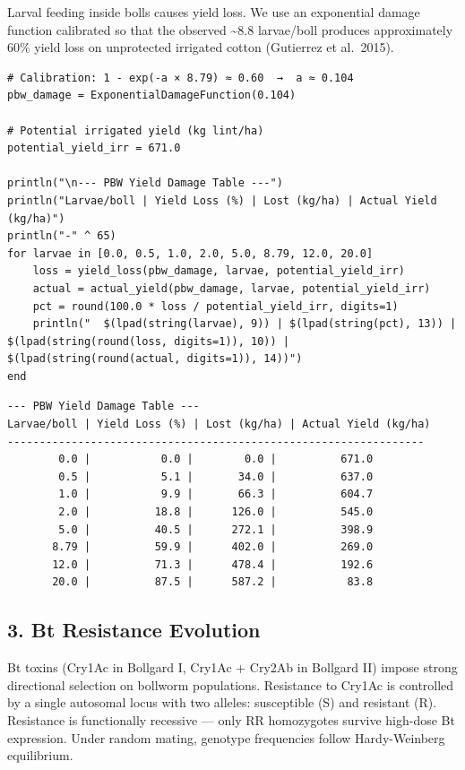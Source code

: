 \label{11186946840608408388}{}


Larval feeding inside bolls causes yield loss. We use an exponential damage function calibrated so that the observed {\textasciitilde}8.8 larvae/boll produces approximately 60\% yield loss on unprotected irrigated cotton (Gutierrez et al.~2015).




\begin{verbatim}
# Calibration: 1 - exp(-a × 8.79) ≈ 0.60  →  a ≈ 0.104
pbw_damage = ExponentialDamageFunction(0.104)

# Potential irrigated yield (kg lint/ha)
potential_yield_irr = 671.0

println("\n--- PBW Yield Damage Table ---")
println("Larvae/boll | Yield Loss (%) | Lost (kg/ha) | Actual Yield (kg/ha)")
println("-" ^ 65)
for larvae in [0.0, 0.5, 1.0, 2.0, 5.0, 8.79, 12.0, 20.0]
    loss = yield_loss(pbw_damage, larvae, potential_yield_irr)
    actual = actual_yield(pbw_damage, larvae, potential_yield_irr)
    pct = round(100.0 * loss / potential_yield_irr, digits=1)
    println("  $(lpad(string(larvae), 9)) | $(lpad(string(pct), 13)) | $(lpad(string(round(loss, digits=1)), 10)) | $(lpad(string(round(actual, digits=1)), 14))")
end
\end{verbatim}




\begin{verbatim}
--- PBW Yield Damage Table ---
Larvae/boll | Yield Loss (%) | Lost (kg/ha) | Actual Yield (kg/ha)
-----------------------------------------------------------------
        0.0 |           0.0 |        0.0 |          671.0
        0.5 |           5.1 |       34.0 |          637.0
        1.0 |           9.9 |       66.3 |          604.7
        2.0 |          18.8 |      126.0 |          545.0
        5.0 |          40.5 |      272.1 |          398.9
       8.79 |          59.9 |      402.0 |          269.0
       12.0 |          71.3 |      478.4 |          192.6
       20.0 |          87.5 |      587.2 |           83.8
\end{verbatim}



\subsection{3. Bt Resistance Evolution}



\label{10705779369326488642}{}


Bt toxins (Cry1Ac in Bollgard I, Cry1Ac + Cry2Ab in Bollgard II) impose strong directional selection on bollworm populations. Resistance to Cry1Ac is controlled by a single autosomal locus with two alleles: susceptible (S) and resistant (R). Resistance is functionally recessive — only RR homozygotes survive high-dose Bt expression. Under random mating, genotype frequencies follow Hardy-Weinberg equilibrium.




